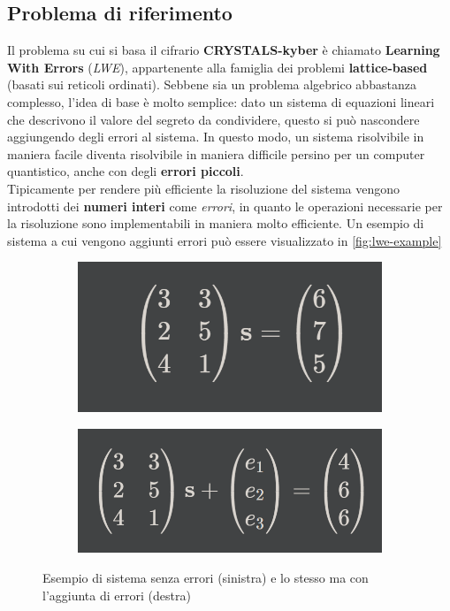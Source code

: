 \subsection{Problema di riferimento}
Il problema su cui si basa il cifrario \textbf{CRYSTALS-kyber} è chiamato \textbf{Learning With Errors} (\emph{LWE}), appartenente alla famiglia dei problemi \textbf{lattice-based} (basati sui reticoli ordinati). Sebbene sia un problema algebrico abbastanza complesso, l'idea di base è molto semplice: dato un sistema di equazioni lineari che descrivono il valore del segreto da condividere, questo si può nascondere aggiungendo degli errori al sistema. In questo modo, un sistema risolvibile in maniera facile diventa risolvibile in maniera difficile persino per un computer quantistico, anche con degli \textbf{errori piccoli}.\\
Tipicamente per rendere più efficiente la risoluzione del sistema vengono introdotti dei \textbf{numeri interi} come \emph{errori}, in quanto le operazioni necessarie per la risoluzione sono implementabili in maniera molto efficiente. Un esempio di sistema a cui vengono aggiunti errori può essere visualizzato in \autoref{fig:lwe-example} \cite{telsy_lwe}

\begin{figure}[h]
    \begin{subfigure}{0.4\textwidth}
        \includegraphics[width=1\textwidth]{capitoli/figure-crittografia/lwe-no-error.png}
    \end{subfigure}
    \hfill
    \begin{subfigure}{0.5\textwidth}
        \includegraphics[width=1\textwidth]{capitoli/figure-crittografia/lwe-with-error.png}
    \end{subfigure}
    \caption{Esempio di sistema senza errori (sinistra) e lo stesso ma con l'aggiunta di errori (destra)}
    \label{fig:lwe-example}
\end{figure}


